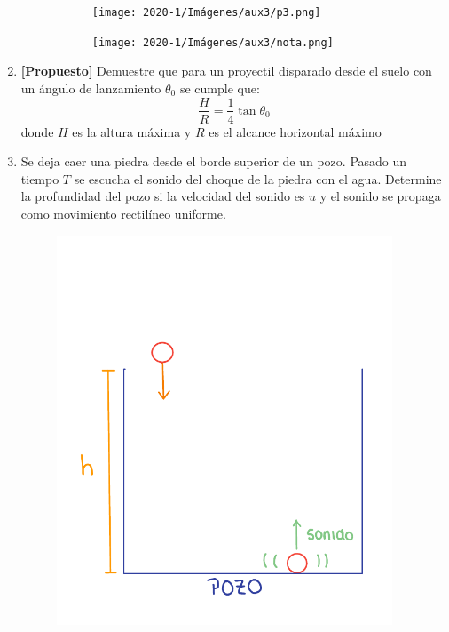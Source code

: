 \documentclass[letterpaper,11pt]{article}
\begin{document}
\begin{enumerate}
\begin{figure}[H]
    \centering
    \begin{subfigure}[t]{0.4\linewidth}
        \centering
        \texttt{[image: 2020-1/Imágenes/aux3/p3.png]}
    \end{subfigure}
    \begin{subfigure}[t]{0.4\linewidth}
        \centering
         \texttt{[image: 2020-1/Imágenes/aux3/nota.png]}
    \end{subfigure}
\end{figure} 

\item \textbf{[Propuesto]} Demuestre que para un proyectil disparado desde el suelo con un ángulo de lanzamiento \(\theta_0\) se cumple que:
\[\frac{H}{R} = \frac{1}{4}\tan{\theta_0}\]
donde $H$ es la altura máxima y $R$ es el alcance horizontal máximo

\item Se deja caer una piedra desde el borde superior de un pozo. Pasado un tiempo $T$ se escucha el
sonido del choque de la piedra con el agua. Determine la profundidad del pozo si la velocidad
del sonido es $u$ y el sonido se propaga como movimiento rectilíneo uniforme.

\begin{figure}[H]
    \centering
    \includegraphics[width=10cm]{2021-2/img/ejercicios/Pozo.pdf}
\end{figure}


\end{enumerate}
\end{document}
